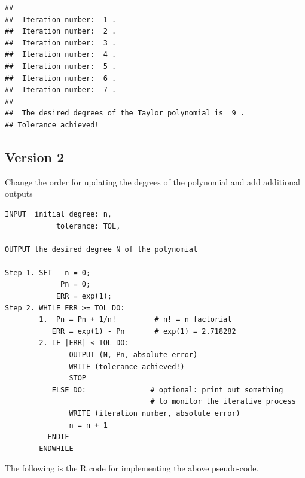 \documentclass[
]{book}
\begin{document}
\begin{verbatim}
## 
##  Iteration number:  1 . 
##  Iteration number:  2 . 
##  Iteration number:  3 . 
##  Iteration number:  4 . 
##  Iteration number:  5 . 
##  Iteration number:  6 . 
##  Iteration number:  7 . 
## 
##  The desired degrees of the Taylor polynomial is  9 . 
## Tolerance achieved!
\end{verbatim}

\hypertarget{version-2}{%
\subsection{Version 2}\label{version-2}}

Change the order for updating the degrees of the polynomial and add additional outputs

\begin{verbatim}
INPUT  initial degree: n, 
            tolerance: TOL, 
            
OUTPUT the desired degree N of the polynomial

Step 1. SET   n = 0;
             Pn = 0; 
            ERR = exp(1);
Step 2. WHILE ERR >= TOL DO:
        1.  Pn = Pn + 1/n!         # n! = n factorial
           ERR = exp(1) - Pn       # exp(1) = 2.718282
        2. IF |ERR| < TOL DO:
               OUTPUT (N, Pn, absolute error)
               WRITE (tolerance achieved!)
               STOP
           ELSE DO:               # optional: print out something
                                  # to monitor the iterative process
               WRITE (iteration number, absolute error)
               n = n + 1
          ENDIF
        ENDWHILE
\end{verbatim}

\hfill\break

The following is the R code for implementing the above pseudo-code.
\end{document}
